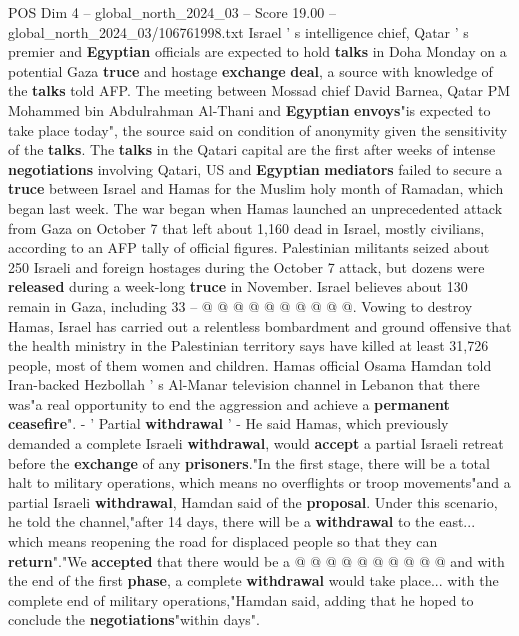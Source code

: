 \begin{textsample}{POS Dim 4 – global\_north\_2024\_03 – Score 19.00 – global\_north\_2024\_03/106761998.txt}  \label{ex:f4_pos_247}
Israel ' s intelligence chief, Qatar ' s premier and \textbf{Egyptian} officials are expected to hold \textbf{talks} in Doha Monday on a potential Gaza \textbf{truce} and hostage \textbf{exchange} \textbf{deal}, a source with knowledge of the \textbf{talks} told AFP.
The meeting between Mossad chief David Barnea, Qatar PM Mohammed bin Abdulrahman Al-Thani and \textbf{Egyptian} \textbf{envoys}"is expected to take place today", the source said on condition of anonymity given the sensitivity of the \textbf{talks}.
The \textbf{talks} in the Qatari capital are the first after weeks of intense \textbf{negotiations} involving Qatari, US and \textbf{Egyptian} \textbf{mediators} failed to secure a \textbf{truce} between Israel and Hamas for the Muslim holy month of Ramadan, which began last week.
The war began when Hamas launched an unprecedented attack from Gaza on October 7 that left about 1,160 dead in Israel, mostly civilians, according to an AFP tally of official figures.
Palestinian militants seized about 250 Israeli and foreign hostages during the October 7 attack, but dozens were \textbf{released} during a week-long \textbf{truce} in November.
Israel believes about 130 remain in Gaza, including 33 -- @ @ @ @ @ @ @ @ @ @.
Vowing to destroy Hamas, Israel has carried out a relentless bombardment and ground offensive that the health ministry in the Palestinian territory says have killed at least 31,726 people, most of them women and children.
Hamas official Osama Hamdan told Iran-backed Hezbollah ' s Al-Manar television channel in Lebanon that there was"a real opportunity to end the aggression and achieve a \textbf{permanent} \textbf{ceasefire}". - ' Partial \textbf{withdrawal} ' - He said Hamas, which previously demanded a complete Israeli \textbf{withdrawal}, would \textbf{accept} a partial Israeli retreat before the \textbf{exchange} of any \textbf{prisoners}."In the first stage, there will be a total halt to military operations, which means no overflights or troop movements"and a partial Israeli \textbf{withdrawal}, Hamdan said of the \textbf{proposal}.
Under this scenario, he told the channel,"after 14 days, there will be a \textbf{withdrawal} to the east... which means reopening the road for displaced people so that they can \textbf{return}"."We \textbf{accepted} that there would be a @ @ @ @ @ @ @ @ @ @ and with the end of the first \textbf{phase}, a complete \textbf{withdrawal} would take place... with the complete end of military operations,"Hamdan said, adding that he hoped to conclude the \textbf{negotiations}"within days".

\end{textsample}

